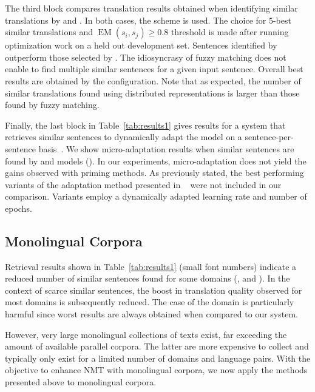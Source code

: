 The third block compares translation results obtained when identifying similar translations by  and . In both cases, the  scheme is used.
The choice for $5$-best similar translations and $\operatorname{EM}(s_i,s_j) \geq 0.8$ threshold is made after running optimization work on a held out development set.
Sentences identified by   outperform those selected by .
The idiosyncrasy of fuzzy matching does not enable to find multiple similar sentences for a given input sentence.
Overall best results are obtained by the  configuration.
Note that as expected, the number of similar translations found using distributed representations is larger than those found by fuzzy matching.

Finally, the last block in Table~\ref{tab:results1} gives results for a system that retrieves similar sentences to dynamically adapt the model on a sentence-per-sentence basis~\cite{Farajian17multidomain,Li18onesentence}. We show micro-adaptation results when similar sentences are found by  and  models ().
In our experiments, micro-adaptation does not yield the gains observed with priming methods. As previously stated, the best performing variants of the adaptation method presented in ~\citet{Farajian17multidomain} were not included in our comparison. Variants employ a dynamically adapted learning rate and number of epochs. 

\subsection*{Monolingual Corpora}

Retrieval results shown in Table~\ref{tab:results1} (small font numbers) indicate a reduced number of similar sentences found for some domains (,  and ). 
In the context of scarce similar sentences, the boost in translation quality observed for most domains is subsequently reduced. The case of the  domain is particularly harmful since worst results are always obtained when compared to our  system.

However, very large monolingual collections of texts exist, far exceeding the amount of available parallel corpora. The latter are more expensive to collect and typically only exist for a limited number of domains and language pairs. With the objective to enhance NMT with monolingual corpora, we now apply the methods presented above to monolingual corpora. 

